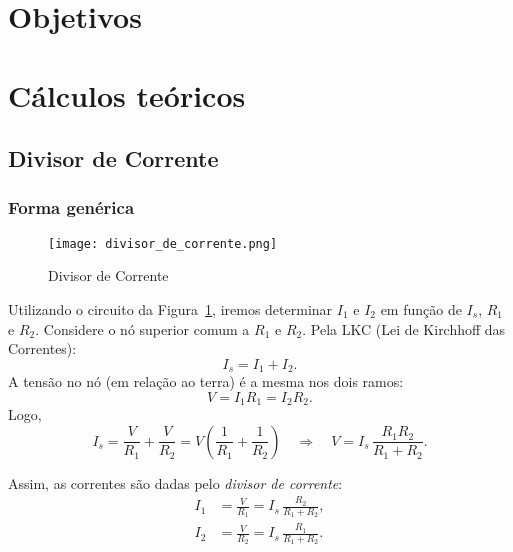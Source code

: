 \documentclass[a4paper, 12pt]{article}
\begin{document}
\section{Objetivos}

\section{Cálculos teóricos}
\subsection{Divisor de Corrente}
\subsubsection{Forma genérica}

\begin{figure}[H]
\centering
\texttt{[image: divisor\_de\_corrente.png]}
\caption{Divisor de Corrente}
\label{fig:divisor_de_corrente}
\end{figure}


Utilizando o circuito da Figura~\ref{fig:divisor_de_corrente}, iremos determinar $I_1$ e $I_2$ em função de $I_s$, $R_1$ e $R_2$. Considere o nó superior comum a $R_1$ e $R_2$. Pela LKC (Lei de Kirchhoff das Correntes):
\begin{equation}
I_s = I_1 + I_2.
\end{equation}
A tensão no nó (em relação ao terra) é a mesma nos dois ramos:
\begin{equation}
V = I_1 R_1 = I_2 R_2.
\end{equation}
Logo,
\begin{equation}
I_s = \frac{V}{R_1} + \frac{V}{R_2}
= V\!\left(\frac{1}{R_1} + \frac{1}{R_2}\right)
\quad\Rightarrow\quad
V = I_s\,\frac{R_1 R_2}{R_1 + R_2}.
\end{equation}

Assim, as correntes são dadas pelo \emph{divisor de corrente}:
\begin{align}
I_1 &= \frac{V}{R_1} = I_s\,\frac{R_2}{R_1 + R_2},\\[6pt]
I_2 &= \frac{V}{R_2} = I_s\,\frac{R_1}{R_1 + R_2}.
\end{align}
\end{document}
